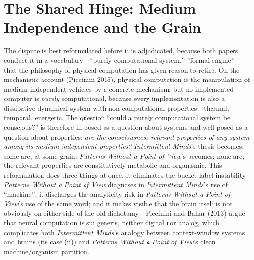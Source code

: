 \documentclass[11pt]{article}
\newcommand{\IM}{\emph{Intermittent Minds}}
\newcommand{\PP}{\emph{Patterns Without a Point of View}}
\begin{document}
\section{The Shared Hinge: Medium Independence and the Grain}

The dispute is best reformulated before it is adjudicated, because both papers conduct it in a vocabulary---``purely computational system,'' ``formal engine''---that the philosophy of physical computation has given reason to retire. On the mechanistic account (Piccinini 2015), physical computation is the manipulation of medium-independent vehicles by a concrete mechanism; but no implemented computer is \emph{purely} computational, because every implementation is also a dissipative dynamical system with non-computational properties---thermal, temporal, energetic. The question ``could a purely computational system be conscious?'' is therefore ill-posed as a question about systems and well-posed as a question about properties: \emph{are the consciousness-relevant properties of any system among its medium-independent properties?} \IM{}'s thesis becomes: some are, at some grain. \PP{}'s becomes: none are; the relevant properties are constitutively metabolic and organismic. This reformulation does three things at once. It eliminates the bucket-label instability \PP{} diagnoses in \IM{}'s use of ``machine''; it discharges the analyticity risk in \PP{}'s use of the same word; and it makes visible that the brain itself is not obviously on either side of the old dichotomy---Piccinini and Bahar (2013) argue that neural computation is sui generis, neither digital nor analog, which complicates both \IM{}'s analogy between context-window systems and brains (its case (ii)) and \PP{}'s clean machine/organism partition.
\end{document}
